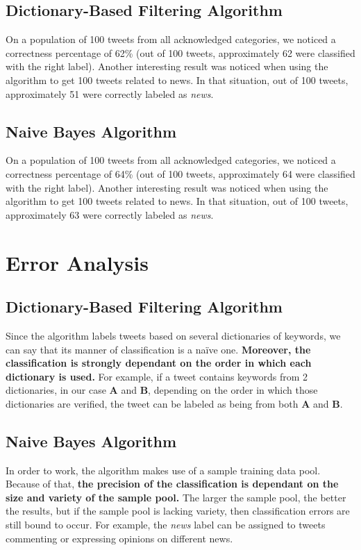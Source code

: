 \documentclass{article}
\begin{document}
\subsection{Dictionary-Based Filtering Algorithm}
\large
{
\quad
On a population of 100 tweets from all acknowledged categories, we noticed a correctness percentage of 62\% (out of 100 tweets, approximately 62 were classified with the right label). Another interesting result was noticed when using the algorithm to get 100 tweets related to news. In that situation, out of 100 tweets, approximately 51 were correctly labeled as \textit{news}.
}

\subsection{Naive Bayes Algorithm}
\large
{
\quad
On a population of 100 tweets from all acknowledged categories, we noticed a correctness percentage of 64\% (out of 100 tweets, approximately 64 were classified with the right label). Another interesting result was noticed when using the algorithm to get 100 tweets related to news. In that situation, out of 100 tweets, approximately 63 were correctly labeled as \textit{news}.
}

\section{Error Analysis}

\subsection{Dictionary-Based Filtering Algorithm}
\large
{
\quad
Since the algorithm labels tweets based on several dictionaries of keywords, we can say that its manner of classification is a naïve one. \textbf{Moreover, the classification is strongly dependant on the order in which each dictionary is used.} For example, if a tweet contains keywords from 2 dictionaries, in our case \textbf{A} and \textbf{B}, depending on the order in which those dictionaries are verified, the tweet can be labeled as being from both \textbf{A} and \textbf{B}. 
}

\subsection{Naive Bayes Algorithm}
\large
{
\quad
In order to work, the algorithm makes use of a sample training data pool. Because of that, \textbf{the precision of the classification is dependant on the size and variety of the sample pool.} The larger the sample pool, the better the results, but if the sample pool is lacking variety, then classification errors are still bound to occur. For example, the \textit{news} label can be assigned to tweets commenting or expressing opinions on different news.
}
\end{document}
